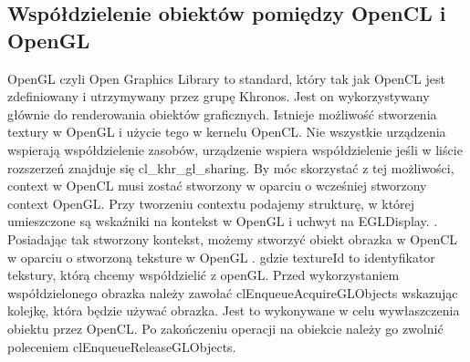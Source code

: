 \subsection [Współdzielenie obiektów pomiędzy OpenCL i OpenGL]{Współdzielenie obiektów pomiędzy OpenCL i OpenGL}
OpenGL czyli Open Graphics Library to standard, który tak jak OpenCL jest zdefiniowany i utrzymywany przez grupę Khronos. Jest on wykorzystywany głównie do renderowania obiektów graficznych.
Istnieje możliwość stworzenia textury w OpenGL i użycie tego w kernelu OpenCL. Nie wszystkie urządzenia wspierają współdzielenie zasobów, urządzenie wspiera współdzielenie jeśli w liście rozszerzeń znajduje się cl\_khr\_gl\_sharing. By móc skorzystać z tej możliwości, context w OpenCL musi zostać stworzony w oparciu o wcześniej stworzony context OpenGL. Przy tworzeniu contextu podajemy strukturę, w której umieszczone są wskaźniki na kontekst w OpenGL i uchwyt na EGLDisplay. 
 .
 Posiadając tak stworzony kontekst, możemy stworzyć obiekt obrazka w OpenCL w oparciu o stworzoną teksture w OpenGL
 . gdzie textureId to identyfikator tekstury, którą chcemy współdzielić z openGL. 
 Przed wykorzystaniem współdzielonego obrazka należy zawołać clEnqueueAcquireGLObjects wskazując kolejkę, która będzie używać obrazka. Jest to wykonywane w celu wywłaszczenia obiektu przez OpenCL. Po zakończeniu operacji na obiekcie należy go zwolnić poleceniem clEnqueueReleaseGLObjects.



